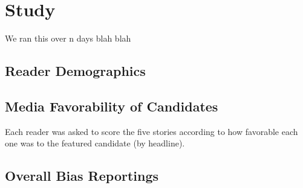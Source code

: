 \chapter{Study}
We ran this over n days blah blah

\section{Reader Demographics}

\section{Media Favorability of Candidates}
Each reader was asked to score the five stories according to how favorable each one was to the featured candidate (by headline).

\section{Overall Bias Reportings}


%
 